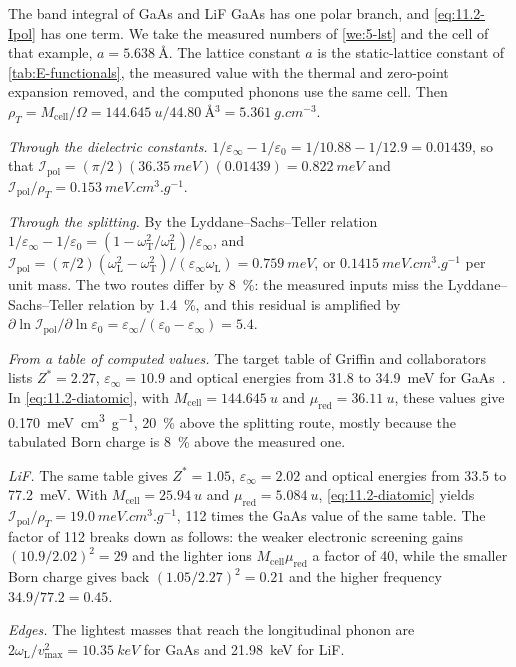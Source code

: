 \begin{workedexample}{The band integral of GaAs and LiF}\label{we:11-ipol}
GaAs has one polar branch, and \cref{eq:11.2-Ipol} has one term. We take the measured numbers of \cref{we:5-lst} and the cell of that example, $a = \SI{5.638}{\angstrom}$. The lattice constant $a$ is the static-lattice constant of \cref{tab:E-functionals}, the measured value with the thermal and zero-point expansion removed, and the computed phonons use the same cell. Then $\rho_T = M_{\mathrm{cell}}/\Omega = \SI{144.645}{u}/\SI{44.80}{\angstrom^3} = \SI{5.361}{g.cm^{-3}}$.

\emph{Through the dielectric constants.} $1/\varepsilon_\infty - 1/\varepsilon_0 = 1/10.88 - 1/12.9 = 0.01439$, so that $\mathcal{I}_{\mathrm{pol}} = (\pi/2)(\SI{36.35}{meV})(0.01439) = \SI{0.822}{meV}$ and $\mathcal{I}_{\mathrm{pol}}/\rho_T = \SI{0.153}{meV.cm^3.g^{-1}}$.

\emph{Through the splitting.} By the Lyddane--Sachs--Teller relation $1/\varepsilon_\infty - 1/\varepsilon_0 = (1 - \omega_{\mathrm{T}}^2/\omega_{\mathrm{L}}^2)/\varepsilon_\infty$, and $\mathcal{I}_{\mathrm{pol}} = (\pi/2)(\omega_{\mathrm{L}}^2 - \omega_{\mathrm{T}}^2)/(\varepsilon_\infty\omega_{\mathrm{L}}) = \SI{0.759}{meV}$, or $\SI{0.1415}{meV.cm^3.g^{-1}}$ per unit mass. The two routes differ by \SI{8}{\percent}: the measured inputs miss the Lyddane--Sachs--Teller relation by \SI{1.4}{\percent}, and this residual is amplified by $\partial\ln\mathcal{I}_{\mathrm{pol}}/\partial\ln\varepsilon_0 = \varepsilon_\infty/(\varepsilon_0 - \varepsilon_\infty) = 5.4$.

\emph{From a table of computed values.} The target table of Griffin and collaborators lists $Z^* = 2.27$, $\varepsilon_\infty = 10.9$ and optical energies from 31.8 to \SI{34.9}{meV} for GaAs~\cite[Table~I]{griffin2020multichannel}. In \cref{eq:11.2-diatomic}, with $M_{\mathrm{cell}} = \SI{144.645}{u}$ and $\mu_{\mathrm{red}} = \SI{36.11}{u}$, these values give \SI{0.170}{meV.cm^3.g^{-1}}, \SI{20}{\percent} above the splitting route, mostly because the tabulated Born charge is \SI{8}{\percent} above the measured one.

\emph{LiF.} The same table gives $Z^* = 1.05$, $\varepsilon_\infty = 2.02$ and optical energies from 33.5 to \SI{77.2}{meV}. With $M_{\mathrm{cell}} = \SI{25.94}{u}$ and $\mu_{\mathrm{red}} = \SI{5.084}{u}$, \cref{eq:11.2-diatomic} yields $\mathcal{I}_{\mathrm{pol}}/\rho_T = \SI{19.0}{meV.cm^3.g^{-1}}$, 112 times the GaAs value of the same table. The factor of 112 breaks down as follows: the weaker electronic screening gains $(10.9/2.02)^2 = 29$ and the lighter ions $M_{\mathrm{cell}}\mu_{\mathrm{red}}$ a factor of 40, while the smaller Born charge gives back $(1.05/2.27)^2 = 0.21$ and the higher frequency $34.9/77.2 = 0.45$.

\emph{Edges.} The lightest masses that reach the longitudinal phonon are $2\omega_{\mathrm{L}}/v_{\mathrm{max}}^2 = \SI{10.35}{keV}$ for GaAs and \SI{21.98}{keV} for LiF.
\end{workedexample}

